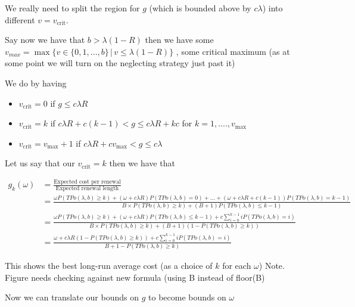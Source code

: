 \documentclass[a4paper,10pt]{article}
\theoremstyle{definition}
\theoremstyle{definition}
\theoremstyle{remark}
\theoremstyle{definition}
\begin{document}
We really need to split the region for $g$ (which is bounded above by $c \lambda$) into different $v=v_{\text{crit}}$.

Say now we have that $b > \lambda (1-R) $ then we have some $v_{max}=\max \{ v \in \{ 0,1,...,b \} \, | \, v \leq \lambda (1-R) \}$ , some critical maximum (as at some point we will turn on the neglecting strategy just past it)

We do by having
\begin{itemize}
\item $v_{\text{crit}}=0$ if $g \leq c \lambda R$
\item $v_{\text{crit}}=k$ if $c \lambda R +c(k-1) < g \leq c \lambda R + kc$ for $k=1,....,v_{\text{max}}$
\item $v_{\text{crit}}=v_{\text{max}}+1$ if $c \lambda R + c v_{\text{max}} < g \leq c \lambda$
\end{itemize}

Let us say that our $v_{\text{crit}}=k$ then we have that

\begin{align*}
g_{k}(\omega)&=\frac{\text{Expected cost per renewal}}{\text{Expected renewal length}} \\
&= \frac{\omega P(TPo(\lambda,b) \geq k) + (\omega + c \lambda R) P(TPo(\lambda,b)=0)+...+(\omega + c \lambda R + c(k-1)) P(TPo(\lambda,b)=k-1)}{B \times P(TPo(\lambda,b) \geq k) + (B+1)P(TPo(\lambda,b) \leq k-1)} \\
&=\frac{\omega P(TPo(\lambda,b) \geq k) + (\omega + c \lambda R )P(TPo(\lambda,b) \leq k-1) + c \sum\limits_{i=0}^{k-1} i P(TPo(\lambda,b)=i)}{B \times P(TPo(\lambda,b) \geq k) + (B+1)(1-P(TPo(\lambda,b) \geq k))} \\
&= \frac{\omega + c \lambda R (1-P(TPo(\lambda,b) \geq k)) + c \sum\limits_{i=0}^{k-1} i P(TPo(\lambda,b)=i)}{B+1-P(TPo(\lambda,b) \geq k)}
\end{align*}

\begin{myfigure}
\begin{center}
\resizebox{.6\textwidth}{!}{
}
\end{center}
\caption{This shows the best long-run average cost (as a choice of $k$ for each $\omega$) Note. Figure needs checking against new formula (using B instead of floor(B)}
\end{myfigure}

Now we can translate our bounds on $g$ to become bounds on $\omega$
\end{document}
